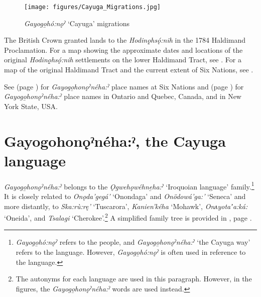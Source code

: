 \begin{figure}
\texttt{[image: figures/Cayuga\_Migrations.jpg]}
\caption{\textit{Gayogo̱hó:nǫˀ} ‘Cayuga’ migrations}
\label{map:Cayuga.migrations}
\end{figure}

The British Crown granted lands to the \textit{Hodinǫ̱hsǫ́:nih} in the 1784 Haldimand Proclamation. For a map showing the approximate dates and locations of the original \textit{Hodinǫ̱hsǫ́:nih} settlements on the lower Haldimand Tract, see \citet[140]{hill_clay_2017}. For a map of the original Haldimand Tract and the current extent of Six Nations, see \citep{six_nations_lands_and_resources_haldimand_2008}. 

See  (page \pageref{map:6nations.today}) for  \textit{Gayogo̱honǫˀnéha:ˀ} place names at Six Nations and  (page \pageref{map:place.names}) for \textit{Gayogo̱honǫˀnéha:ˀ} place names in Ontario and Quebec, Canada, and in New York State, USA.



\section{Gayogohonǫˀnéha:ˀ, the Cayuga language} \label{ch:Gayogohó:nǫˀ, the Cayuga language}

\textit{Gayogo̱honǫˀnéha:ˀ} belongs to the \textit{Ǫgwehǫwéhne̱ha:ˀ} ‘Iroquoian language’ family.\footnote{\textit{Gayogo̱hó:nǫˀ} refers to the people, and \textit{Gayogo̱honǫˀnéha:ˀ} ‘the Cayuga way’ refers to the language. However, \textit{Gayogo̱hó:nǫˀ} is often used in reference to the language.} It is closely related to  \textit{Onǫda’gegá’} ‘Onondaga’ and \textit{Onödowá’ga:’} ‘Seneca’ and more distantly, to \textit{Ska:rù:rę’} ‘Tuscarora’, \textit{Kanien’kéha} ‘Mohawk’, \textit{Onʌyotaʼa:ká:} ‘Oneida’, and \textit{Tsalagi} ‘Cherokee’.\footnote{The autonyms for each language are used in this paragraph. However, in the figures, the \textit{Gayogo̱honǫˀnéha:ˀ} words are used instead.} A simplified family tree is provided in , page \pageref{map:Iroq.language.family}.

